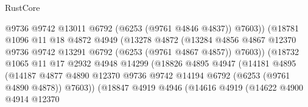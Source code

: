 \begin{lexlean}{RustCore}
\begin{coremodule}
                                      @9736
                                      @9742
                                      @13011
                                      @6792
                                      (@6253 (@9761 @4846 @4837))
                                      @7603))
                                  (@18781
                                    @1096
                                    @11
                                    @18
                                    @4872
                                    @4949
                                    (@13278
                                      @4872
                                      (@13284
                                        @4856
                                        @4867
                                        @12370
                                        @9736
                                        @9742
                                        @13291
                                        @6792
                                        (@6253 (@9761 @4867 @4857))
                                        @7603))
                                    (@18732
                                      @1065
                                      @11
                                      @17
                                      @2932
                                      @4948
                                      @14299
                                      (@18826
                                        @4895
                                        @4947
                                        (@14181
                                          @4895
                                          (@14187
                                            @4877
                                            @4890
                                            @12370
                                            @9736
                                            @9742
                                            @14194
                                            @6792
                                            (@6253 (@9761 @4890 @4878))
                                            @7603))
                                        (@18847
                                          @4919
                                          @4946
                                          (@14616
                                            @4919
                                            (@14622
                                              @4900
                                              @4914
                                              @12370

\end{coremodule}
\end{lexlean}
